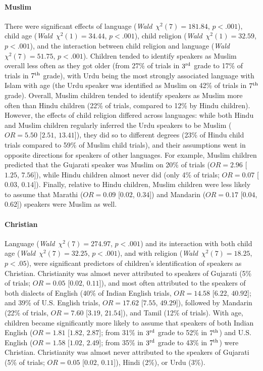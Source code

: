 \documentclass{foushee-adapted-preprint}
\begin{document}
\paragraph*{Muslim} %
There were significant effects of language (\textit{Wald}~$\chi^2(7)=181.84$, $p<.001$), child age (\textit{Wald}~$\chi^2(1)=34.44$, $p<.001$), child religion (\textit{Wald}~$\chi^2(1)=32.59$, $p<.001$), and the interaction between child religion and language (\textit{Wald}~$\chi^2(7)=51.75$, $p<.001$). 
Children tended to identify speakers as Muslim overall less often as they got older (from 27\% of trials in $3^{\textnormal{rd}}$ grade to 17\% of trials in $7^{\textnormal{th}}$ grade), 
with Urdu being the most strongly associated language with Islam with age (the Urdu speaker was identified as Muslim on 42\% of trials in $7^{\textnormal{th}}$ grade). 
Overall, Muslim children tended to identify speakers as Muslim more often than Hindu children (22\% of trials, compared to 12\% by Hindu children). 
However, the effects of child religion differed across languages: while both Hindu and Muslim children regularly inferred the Urdu speakers to be Muslim ($OR=5.50$ [$2.51$, $13.41$]), they did so to different degrees (23\% of Hindu child trials compared to 59\% of Muslim child trials), and their assumptions went in opposite directions for speakers of other languages. 
For example, Muslim children predicted that the Gujarati speaker was Muslim on 20\% of trials ($OR=2.96$ [$1.25$, $7.56$]), while Hindu children almost never did (only 4\% of trials; $OR=0.07$ [$0.03$, $0.14$]). 
Finally, relative to Hindu children, Muslim children were less likely to assume that Marathi ($OR=0.09$ [$0.02$, $0.34$]) and Mandarin ($OR=0.17$ [$0.04$, $0.62$]) speakers were Muslim as well.

\paragraph*{Christian} %
Language (\textit{Wald}~$\chi^2(7)=274.97$, $p<.001$) and its interaction with both child age (\textit{Wald}~$\chi^2(7)=32.25$, $p<.001$), and with religion (\textit{Wald}~$\chi^2(7)=18.25$, $p<.05$), were significant predictors of children's identification of speakers as Christian. 
Christianity was almost never attributed to speakers of Gujarati (5\% of trials; $OR=0.05$ [$0.02$, $0.11$]), and most often attributed to the speakers of both dialects of English (40\% of Indian English trials, $OR=14.58$ [$6.22$, $40.92$]; and 39\% of U.S. English trials, $OR=17.62$ [$7.55$, $49.29$]), followed by Mandarin (22\% of trials, $OR=7.60$ [$3.19$, $21.54$]), and Tamil (12\% of trials). 
With age, children became significantly more likely to assume that speakers of both Indian English ($OR=1.81$ [$1.82$, $2.87$]; from 31\% in $3^{\textnormal{rd}}$ grade to 52\% in $7^{\textnormal{th}}$) 
and U.S. English ($OR=1.58$ [$1.02$, $2.49$]; from 35\% in $3^{\textnormal{rd}}$ grade to 43\% in $7^{\textnormal{th}}$) 
were Christian. Christianity was almost never attributed to the speakers of Gujarati (5\% of trials; $OR=0.05$ [$0.02$, $0.11$]), Hindi (2\%), or Urdu (3\%). 
\end{document}
